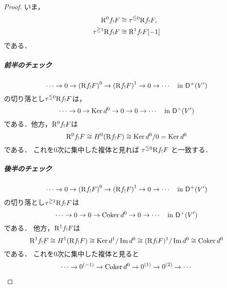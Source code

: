 \begin{proof}
    いま，
    \begin{align*}
        \mathrm{R}^0 f_!F&\cong\tau^{\leqq0}\mathrm{R} f_!F,\\
        \tau^{\geqq1}\mathrm{R} f_!F&\cong\mathrm{R}^1 f_!F[-1]
    \end{align*}
    である．
    \begin{center}
        \begin{minipage}{.9\textwidth}
        \begin{redleftbar}
            \subparagraph*{前半のチェック}
            \[
                \cdots\to0\to\left(\mathrm{R} f_!F\right)^0
                \to\left(\mathrm{R} f_!F\right)^1
                \to0\to\cdots
                \quad\text{in \(\mathsf{D}^+(V')\)}
            \]
            の切り落とし\(\tau^{\leqq0}\mathrm{R} f_!F\)は，
            \[
                \cdots\to0\to\mathop{\mathrm{Ker}}\nolimits d^0
                \to0
                \to0\to\cdots
                \quad\text{in \(\mathsf{D}^+(V')\)}
            \]
            である．他方，\(\mathrm{R}^0 f_!F\)は
            \[
                \mathrm{R}^0 f_!F
                \cong H^0(\mathrm{R} f_!F)
                \cong \mathop{\mathrm{Ker}}\nolimits d^0/0=\mathop{\mathrm{Ker}}\nolimits d^0
            \]
            である．
            これを0次に集中した複体と見れば
            \(\tau^{\leqq0}\mathrm{R} f_!F\)
            と一致する．
        \end{redleftbar}
        \end{minipage}
    \end{center}
    \begin{center}
        \begin{minipage}{.9\textwidth}
        \begin{redleftbar}
            \subparagraph*{後半のチェック}
            \[
                \cdots\to0\to\left(\mathrm{R} f_!F\right)^0
                \to\left(\mathrm{R} f_!F\right)^1
                \to0\to\cdots
                \quad\text{in \(\mathsf{D}^+(V')\)}
            \]
            の切り落とし\(\tau^{\geqq1}\mathrm{R} f_!F\)は
            \[
                \cdots\to0\to0
                \to\mathop{\mathrm{Coker}}\nolimits d^0
                \to0\to\cdots
                \quad\text{in \(\mathsf{D}^+(V')\)}
            \]
            である．
            他方，\(\mathrm{R}^1 f_!F\)は
            \[
                \mathrm{R}^1 f_!F
                \cong H^1(\mathrm{R} f_!F)
                \cong \mathop{\mathrm{Ker}}\nolimits d^1/\mathop{\mathrm{Im}}\nolimits d^0
                \cong(\mathrm{R} f_!F)^1/\mathop{\mathrm{Im}}\nolimits d^0
                \cong\mathop{\mathrm{Coker}}\nolimits d^0
            \]
            である．
            これを0次に集中した複体と見ると
            \[
                \cdots\to0^{(-1)}\to\mathop{\mathrm{Coker}}\nolimits d^0
                \to0^{(1)}
                \to0^{(2)}\to\cdots
\]
\end{redleftbar}
\end{minipage}
\end{center}
\end{proof}
